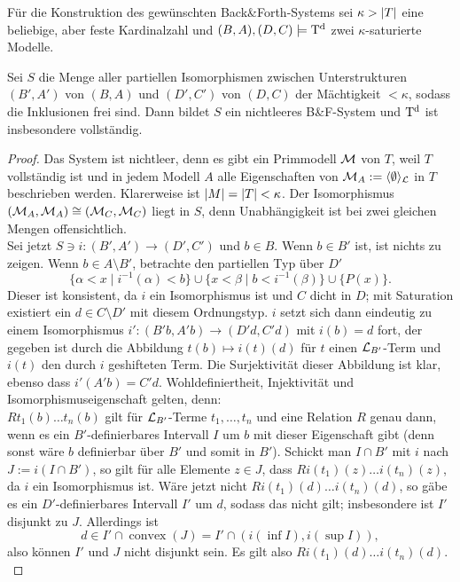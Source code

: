 \newpage
Für die Konstruktion des gewünschten Back\&Forth-Systems sei $\kappa>{\left| T \right|}$ eine beliebige, aber feste Kardinalzahl und $(B,A),(D,C)\models\operatorname{T^d}$ zwei $\kappa$-saturierte Modelle.
\begin{theorem}\label{BackForth}
	Sei $S$ die Menge aller partiellen Isomorphismen zwischen Unterstrukturen $(B',A')$ von $(B,A)$ und $(D',C')$ von $(D,C)$ der Mächtigkeit $<\kappa$, sodass die Inklusionen frei sind. Dann bildet $S$ ein nichtleeres B\&F-System und $\operatorname{T^d}$ ist insbesondere vollständig.
\end{theorem}
\begin{proof}
	Das System ist nichtleer, denn es gibt ein Primmodell $\mathcal{M}$ von $T$, weil $T$ vollständig ist und in jedem Modell $A$ alle Eigenschaften von $\mathcal{M}_A:=\langle\emptyset\rangle_{\mathcal{L}}$ in $T$ beschrieben werden. Klarerweise ist ${\left| M \right|}={\left| T \right|}<\kappa$. Der Isomorphismus $(\mathcal{M}_A,\mathcal{M}_A)\cong(\mathcal{M}_C,\mathcal{M}_C)$ liegt in $S$, denn Unabhängigkeit ist bei zwei gleichen Mengen offensichtlich.\\
	Sei jetzt $S\ni i:(B',A')\rightarrow(D',C')$ und $b\in B$. Wenn $b\in B'$ ist, ist nichts zu zeigen. Wenn $b\in A\setminus B'$, betrachte den partiellen Typ über $D'$ $$\{\alpha<x\mid i^{-1}(\alpha)<b\}\cup\{x<\beta\mid b<i^{-1}(\beta)\}\cup\{P(x)\}.$$
	Dieser ist konsistent, da $i$ ein Isomorphismus ist und $C$ dicht in $D$; mit Saturation existiert ein $d\in C\setminus D'$ mit diesem Ordnungstyp. $i$ setzt sich dann eindeutig zu einem Isomorphismus $i':(B'b,A'b)\rightarrow(D'd,C'd)$ mit $i(b)=d$ fort, der gegeben ist durch die Abbildung $t(b)\mapsto i(t)(d)$ für $t$ einen $\mathcal{L}_{B'}$-Term und $i(t)$ den durch $i$ geshifteten Term. Die Surjektivität dieser Abbildung ist klar, ebenso dass $i'(A'b)=C'd$. Wohldefiniertheit, Injektivität und Isomorphismuseigenschaft gelten, denn:\\
	$Rt_1(b)\dots t_n(b)$ gilt für $\mathcal{L}_{B'}$-Terme $t_1,\dots,t_n$ und eine Relation $R$ genau dann, wenn es ein $B'$-definierbares Intervall $I$ um $b$ mit dieser Eigenschaft gibt (denn sonst wäre $b$ definierbar über $B'$ und somit in $B'$). Schickt man $I\cap B'$ mit $i$ nach $J:=i(I\cap B')$, so gilt für alle Elemente $z\in J$, dass $Ri(t_1)(z)\dots i(t_n)(z)$, da $i$ ein Isomorphismus ist. Wäre jetzt nicht $Ri(t_1)(d)\dots i(t_n)(d)$, so gäbe es ein $D'$-definierbares Intervall $I'$ um $d$, sodass das nicht gilt; insbesondere ist $I'$ disjunkt zu $J$. Allerdings ist $$d\in I'\cap\operatorname{convex}(J)=I'\cap(i(\inf I),i(\sup I)),$$ also können $I'$ und $J$ nicht disjunkt sein. Es gilt also $Ri(t_1)(d)\dots i(t_n)(d)$.\\

\end{proof}
